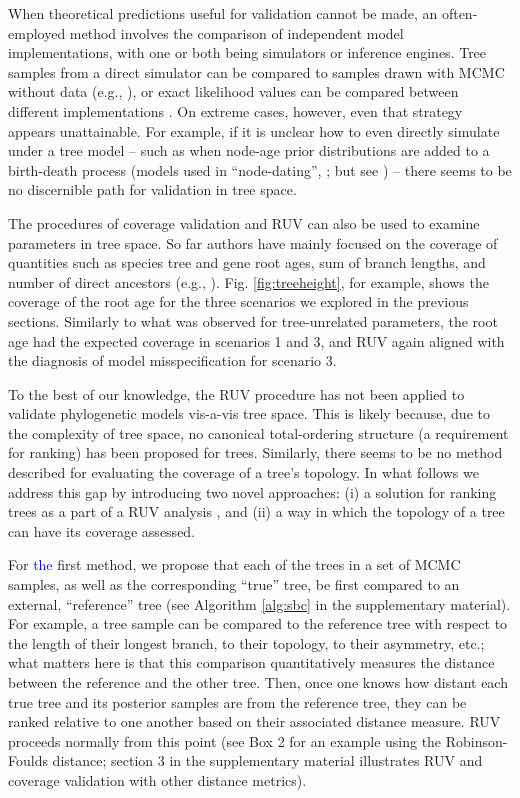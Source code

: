 \documentclass[oneside]{article}
\begin{document}
When theoretical predictions useful for validation cannot be made, an often-employed method involves the comparison of independent model implementations, with one or both being simulators or inference engines.
Tree samples from a direct simulator can be compared to samples drawn with MCMC without data (e.g., \citealp{zhang23}), or exact likelihood values can be compared between different implementations \citep{andreoletti22}.
On extreme cases, however, even that strategy appears unattainable.
For example, if it is unclear how to even directly simulate under a tree model -- such as when node-age prior distributions are added to a birth-death process (models used in ``node-dating'', \citealp{ho09}; but see \citealp{heled12}) -- there seems to be no discernible path for validation in tree space.

The procedures of coverage validation and RUV can also be used to examine parameters in tree space.
So far authors have mainly focused on the coverage of quantities such as species tree and gene root ages, sum of branch lengths, and number of direct ancestors (e.g., \citealp{gavryushkina14,ogilvie22,zhang23}).
Fig. \ref{fig:treeheight}, for example, shows the coverage of the root age for the three scenarios we explored in the previous sections.
Similarly to what was observed for tree-unrelated parameters, the root age had the expected coverage in scenarios 1 and 3, and RUV again aligned with the diagnosis of model misspecification for scenario 3.

To the best of our knowledge, the RUV procedure has not been applied to validate phylogenetic models vis-a-vis tree space.
This is likely because, due to the complexity of tree space, no canonical total-ordering structure (a requirement for ranking) has been proposed for trees.
Similarly, there seems to be no method described for evaluating the coverage of a tree's topology.
In what follows we address this gap by introducing two novel approaches: (i) a solution for ranking trees as a part of a  RUV analysis , and (ii) a way in which the topology of a tree can have its coverage assessed.

For \textcolor{blue}{the} first method, we propose that each of the trees in a set of MCMC samples, as well as the corresponding ``true'' tree, be first compared to an external, ``reference'' tree (see Algorithm \ref{alg:sbc} in the supplementary material).
For example, a tree sample can be compared to the reference tree with respect to the length of their longest branch, to their topology, to their asymmetry, etc.;
what matters here is that this comparison quantitatively measures the distance between the reference and the other tree.
Then, once one knows how distant each true tree and its posterior samples are from the reference tree, they can be ranked relative to one another based on their associated distance measure.
RUV proceeds normally from this point (see Box 2 for an example using the Robinson-Foulds distance; section 3 in the supplementary material illustrates RUV and coverage validation with other distance metrics).
\end{document}
